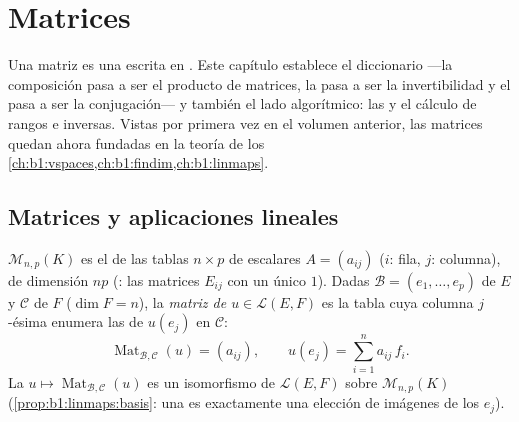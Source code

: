 \chapter{Matrices}\label{ch:b1:matrices}

Una matriz es una  escrita en . Este
capítulo establece el diccionario ---la composición pasa a ser el
producto de matrices, la  pasa a ser la invertibilidad y
el  pasa a ser la conjugación--- y también el lado
algorítmico: las  y el cálculo de rangos e
inversas. Vistas por primera vez en el volumen anterior, las matrices
quedan ahora fundadas en la teoría de los
\cref{ch:b1:vspaces,ch:b1:findim,ch:b1:linmaps}.

\section{Matrices y aplicaciones lineales}

\begin{definition}\label{def:b1:matrices:def}
$\mathcal{M}_{n,p}(K)$ es el  de las tablas
$n \times p$ de escalares $A = (a_{ij})$ ($i$: fila, $j$: columna),
de dimensión $np$ (: las matrices $E_{ij}$ con un único $1$).
Dadas  $\mathcal{B} = (e_1, \dots, e_p)$ de $E$ y $\mathcal{C}$
de $F$ ($\dim F = n$), la \emph{matriz de $u \in \mathcal{L}(E, F)$}
es la tabla cuya columna $j$-ésima enumera las  de
$u(e_j)$ en $\mathcal{C}$:
\[
\operatorname{Mat}_{\mathcal{B},\mathcal{C}}(u) = (a_{ij}),
\qquad u(e_j) = \sum_{i=1}^{n} a_{ij}\, f_i .
\]
La 
$u \mapsto \operatorname{Mat}_{\mathcal{B},\mathcal{C}}(u)$ es un
isomorfismo de $\mathcal{L}(E, F)$ sobre $\mathcal{M}_{n,p}(K)$
(\cref{prop:b1:linmaps:basis}: una  es exactamente
una elección de imágenes de los $e_j$).
\end{definition}

